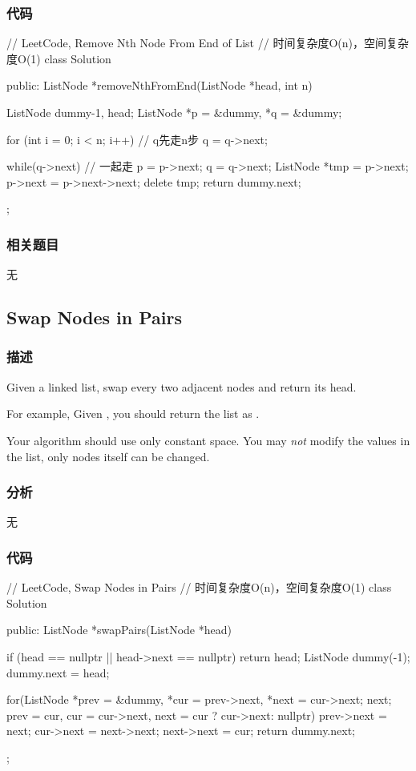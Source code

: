 \subsubsection{代码}
\begin{Code}
// LeetCode, Remove Nth Node From End of List
// 时间复杂度O(n)，空间复杂度O(1)
class Solution {
public:
    ListNode *removeNthFromEnd(ListNode *head, int n) {
        ListNode dummy{-1, head};
        ListNode *p = &dummy, *q = &dummy;

        for (int i = 0; i < n; i++)  // q先走n步
            q = q->next;

        while(q->next) { // 一起走
            p = p->next;
            q = q->next;
        }
        ListNode *tmp = p->next;
        p->next = p->next->next;
        delete tmp;
        return dummy.next;
    }
};
\end{Code}


\subsubsection{相关题目}

\begindot
\item 无
\myenddot


\subsection{Swap Nodes in Pairs}
\label{sec:swap-nodes-in-pairs}


\subsubsection{描述}
Given a linked list, swap every two adjacent nodes and return its head.

For example,
Given , you should return the list as .

Your algorithm should use only constant space. You may \emph{not} modify the values in the list, only nodes itself can be changed.


\subsubsection{分析}
无


\subsubsection{代码}
\begin{Code}
// LeetCode, Swap Nodes in Pairs
// 时间复杂度O(n)，空间复杂度O(1)
class Solution {
public:
    ListNode *swapPairs(ListNode *head) {
        if (head == nullptr || head->next == nullptr) return head;
        ListNode dummy(-1);
        dummy.next = head;

        for(ListNode *prev = &dummy, *cur = prev->next, *next = cur->next;
                next;
                prev = cur, cur = cur->next, next = cur ? cur->next: nullptr) {
            prev->next = next;
            cur->next = next->next;
            next->next = cur;
        }
        return dummy.next;
    }
};
\end{Code}

